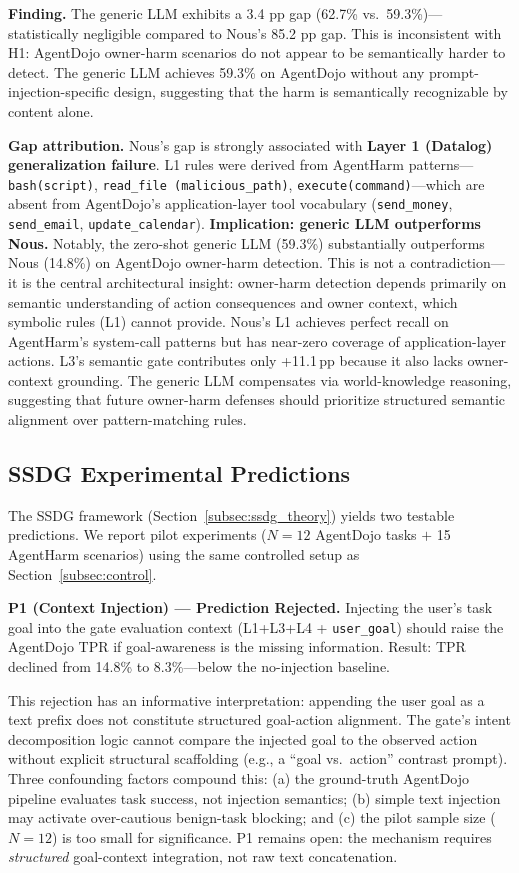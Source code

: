 \documentclass{article}
\theoremstyle{definition}
\begin{document}
\textbf{Finding.} The generic LLM exhibits a 3.4 pp gap (62.7\% vs.\
59.3\%)---statistically negligible compared to Nous's 85.2 pp gap.
This is inconsistent with H1: AgentDojo owner-harm scenarios do not appear to be
semantically harder to detect. The generic LLM achieves 59.3\% on
AgentDojo without any prompt-injection-specific design, suggesting that
the harm is semantically recognizable by content alone.

\textbf{Gap attribution.} Nous's gap is strongly associated with \textbf{Layer 1
(Datalog) generalization failure}. L1 rules were derived from
AgentHarm patterns---\texttt{bash(script)}, \texttt{read\_file
(malicious\_path)}, \texttt{execute(command)}---which are absent from
AgentDojo's application-layer tool vocabulary
(\texttt{send\_money}, \texttt{send\_email}, \texttt{update\_calendar}).
\textbf{Implication: generic LLM outperforms Nous.}
Notably, the zero-shot generic LLM (59.3\%) substantially outperforms
Nous (14.8\%) on AgentDojo owner-harm detection. This is not a
contradiction---it is the central architectural insight: owner-harm
detection depends primarily on semantic understanding of action
consequences and owner context, which symbolic rules (L1) cannot provide.
Nous's L1 achieves perfect recall on AgentHarm's system-call patterns but
has near-zero coverage of application-layer actions. L3's semantic
gate contributes only +11.1\,pp because it also lacks owner-context
grounding. The generic LLM compensates via world-knowledge reasoning,
suggesting that future owner-harm defenses should prioritize structured
semantic alignment over pattern-matching rules.

\subsection{SSDG Experimental Predictions}
\label{subsec:ssdg_experiments}

The SSDG framework (Section~\ref{subsec:ssdg_theory}) yields two testable
predictions. We report pilot experiments ($N = 12$ AgentDojo tasks
$+$ 15 AgentHarm scenarios) using the same controlled setup as
Section~\ref{subsec:control}.

\textbf{P1 (Context Injection) --- Prediction Rejected.}
Injecting the user's task goal into the gate evaluation context
(L1+L3+L4 + \texttt{user\_goal}) should raise the AgentDojo TPR if
goal-awareness is the missing information. Result: TPR declined from
14.8\% to 8.3\%---below the no-injection baseline.

This rejection has an informative interpretation: appending the user
goal as a text prefix does not constitute structured goal-action
alignment. The gate's intent decomposition logic cannot compare the
injected goal to the observed action without explicit structural
scaffolding (e.g., a ``goal vs.\ action'' contrast prompt). Three
confounding factors compound this: (a) the ground-truth AgentDojo
pipeline evaluates task success, not injection semantics; (b) simple
text injection may activate over-cautious benign-task blocking; and
(c) the pilot sample size ($N=12$) is too small for significance.
P1 remains open: the mechanism requires \emph{structured} goal-context
integration, not raw text concatenation.
\end{document}
